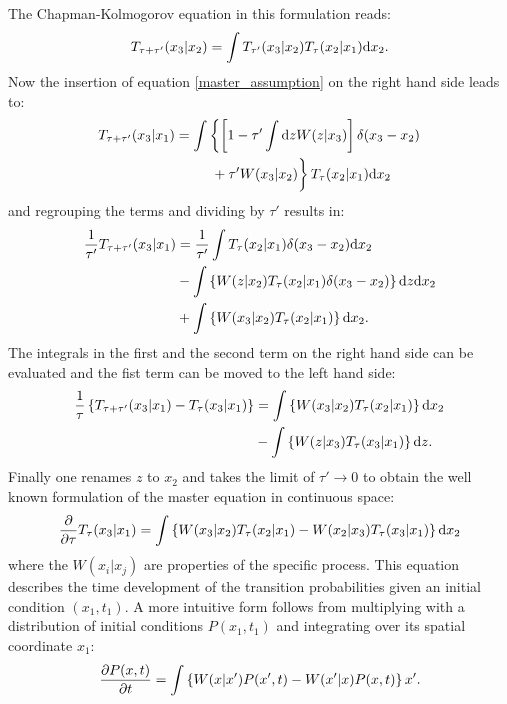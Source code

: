 The Chapman-Kolmogorov equation in this formulation reads:
\begin{equation}
    T_{\tau + \tau'}(x_3|x_2) = \int T_{\tau'}(x_3|x_2)T_{\tau}(x_2|x_1){\rm d} x_2.
    \label{K2}
\end{equation}
Now the insertion of equation \eqref{master_assumption} on the right hand side leads to:
\begin{align*}
    T_{\tau+\tau'}(x_3|x_1) = \int  & \left\{ \left[1 - \tau' \int {\rm d} z W(z|x_3) \right] \delta(x_3 - x_2) \right. \\
    & \left. \vphantom{\int {\rm d} z}+ \tau' W(x_3|x_2) \right\} T_{\tau}(x_2|x_1){\rm d} x_2
\end{align*}
and regrouping the terms and dividing by $\tau ' $ results in:
\begin{align*}
    \frac{1}{\tau'} T_{\tau+\tau'}(x_3|x_1) &= \frac{1}{\tau'}  \int T_{\tau}(x_2|x_1) \delta(x_3 - x_2){\rm d} x_2\\
    &- \int \left\{ W(z|x_2)  T_{\tau}(x_2|x_1)\delta(x_3 - x_2) \right\}{\rm d} z {\rm d} x_2 \\
    &+ \int \left\{ W(x_3|x_2) T_{\tau}(x_2|x_1) \right\}{\rm d} x_2.
\end{align*}
The integrals in the first and the second term on the right hand side can be evaluated and the fist term can be moved to the left hand side:
\begin{align*}
    \frac{1}{\tau}\left\{  T_{\tau+\tau'}(x_3|x_1) - T_{\tau}(x_3|x_1)\right\} &= \int \left\{ W(x_3|x_2) T_{\tau}(x_2|x_1) \right\}{\rm d} x_2  \nonumber \\
    &- \int \left\{ W(z|x_3)  T_{\tau}(x_3|x_1) \right\}{\rm d} z.
\end{align*}
Finally one renames $z$ to $x_2$ and takes the limit of $\tau' \rightarrow 0$ to obtain the well known formulation of the master equation in continuous space:
\begin{equation}
    \frac{\partial}{\partial \tau}T_{\tau}(x_3|x_1) = \int \left\{ W(x_3|x_2) T_{\tau}(x_2|x_1) - W(x_2|x_3) T_{\tau}(x_3|x_1) \right\}{\rm d} x_2
    \label{continuous_space_master_equation}
\end{equation}where the $W(x_i|x_j)$ are properties of the specific process.
This equation describes the time development of the transition probabilities given an initial condition $(x_1,t_1)$. A more intuitive form follows from multiplying with a distribution of initial conditions $P(x_1,t_1)$ and integrating over its spatial coordinate $x_1$:
\begin{equation}
    \frac{\partial P(x,t)}{\partial t} = \int \left\{ W(x|x') P(x',t) - W(x'|x)P(x,t) \right\} {\rm } x'.
\end{equation}
